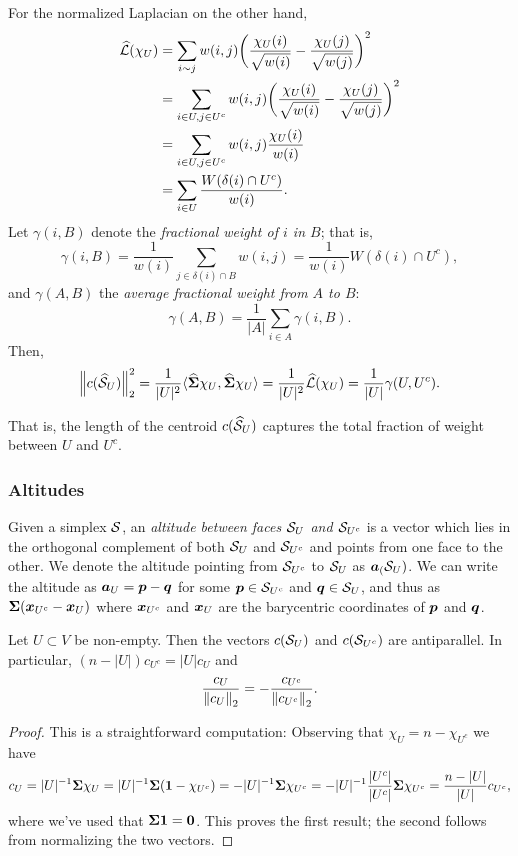 For the normalized Laplacian on the other hand,
\begin{align}
    \widehat{\mathcal{L}}(\chi_U)&=\sum_{i\sim j}w(i,j) \bigg(\frac{\chi_U(i)}{\sqrt{w(i)}}-\frac{\chi_U(j)}{\sqrt{w(j)}}\bigg)^2 \notag \\
    &= \sum_{i\in U,j\in U^c}w(i,j)\bigg(\frac{\chi_U(i)}{\sqrt{w(i)}}-\frac{\chi_U(j)}{\sqrt{w(j)}}\bigg)^2 \notag \\
    &= \sum_{i\in U,j\in U^c}w(i,j)\frac{\chi_U(i)}{w(i)} \notag \\
    &= \sum_{i\in U}\frac{W(\delta(i)\cap U^c)}{w(i)}. \label{eq:Lnf(chiU)}
\end{align}
Let $\gamma(i,B)$ denote the \emph{fractional weight of $i$ in $B$}; that is, \[\gamma(i,B)=\frac{1}{w(i)}\sum_{j\in\delta(i)\cap B} w(i,j)=\frac{1}{w(i)}W(\delta(i)\cap U^c),\]
and $\gamma(A,B)$ the \emph{average fractional weight from $A$ to $B$}: 
\[\gamma(A,B) =\frac{1}{|A|}\sum_{i\in A}\gamma(i,B). \]
Then, 
\begin{equation*}
    \norm{c(\widehat{\mathcal{S}}_U)}_2^2 = \frac{1}{|U|^2}\langle \widehat{\boldsymbol{\Sigma}}\chi_U,\widehat{\boldsymbol{\Sigma}}\chi_U\rangle = \frac{1}{|U|^2}\widehat{\mathcal{L}}(\chi_U) = \frac{1}{|U|} \gamma(U,U^c).
\end{equation*}


That is, the length of the centroid $c(\widehat{\mathcal{S}}_U)$ captures the total fraction of weight between $U$ and $U^c$. 



\subsubsection{Altitudes}
Given a simplex $\mathcal{S}$, an \emph{altitude between faces $\mathcal{S}_U$ and $\mathcal{S}_{U^c}$} is a vector which lies in the orthogonal complement of both $\mathcal{S}_U$ and $\mathcal{S}_{U^c}$ and points from one face to the other. 
We denote the altitude pointing from $\mathcal{S}_{U^c}$ to $\mathcal{S}_{U}$ as $\vb*{a}_(\mathcal{S}_U)$. We can write the altitude as $\vb*{a}_U=\vb*{p}-\vb*{q}$ for some $\vb*{p}\in \mathcal{S}_{U^c}$ and $\vb*{q}\in\mathcal{S}_{U}$, and thus as $\boldsymbol{\Sigma}(\vb*{x}_{U^c}-\vb*{x}_{U})$ where $\vb*{x}_{U^c}$ and $\vb*{x}_{U}$ are the barycentric coordinates of $\vb*{p}$ and $\vb*{q}$. 

\begin{lemma}
\label{lem:complimentary_centroids}
Let $U\subset V$ be non-empty. Then the vectors $c(\mathcal{S}_U)$ and $c(\mathcal{S}_{U^c})$ are antiparallel. In particular, $(n-|U|)c_{U^c} = |U|c_{U}$ and 
\[\frac{c_U}{\norm{c_U}_2}=-\frac{c_{U^c}}{\norm{c_{U^c}}_2}.\]
\end{lemma}
\begin{proof}
This is a straightforward computation: Observing that $\chi_U=n-\chi_{U^c}$ we have  
\[c_U = |U|^{-1}\boldsymbol{\Sigma}\chi_U = |U|^{-1}\boldsymbol{\Sigma}(\vb{1}-\chi_{U^c})=-|U|^{-1}\boldsymbol{\Sigma}\chi_{U^c}=-|U|^{-1}\frac{|U^c|}{|U^c|}\boldsymbol{\Sigma}\chi_{U^c}=\frac{n-|U|}{|U|}c_{U^c},\]
where we've used that $\boldsymbol{\Sigma}\vb{1}=\vb{0}$. This proves the first result; the second follows from normalizing the two vectors.
\end{proof}

